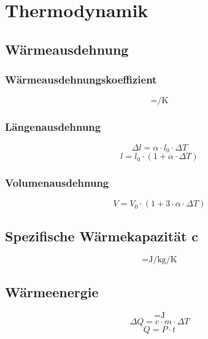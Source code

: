 \documentclass[a4paper]{IEEEtran}
\begin{document}
  \section{Thermodynamik}
  \subsection{Wärmeausdehnung}
  \subsubsection{Wärmeausdehnungskoeffizient}
  \begin{equation}
    [\alpha] = \si{\per\kelvin}
  \end{equation}
  \subsubsection{Längenausdehnung}
  \begin{equation}
    \Delta l = \alpha \cdot l_0 \cdot \Delta T
  \end{equation}
  \begin{equation}
    l = l_0 \cdot (1 + \alpha \cdot \Delta T)
  \end{equation}
  \subsubsection{Volumenausdehnung}
  \begin{equation}
    V = V_0 \cdot (1 + 3 \cdot \alpha \cdot \Delta T)
  \end{equation}

  \subsection{Spezifische Wärmekapazität c}
  \begin{equation}
    [c] = \si{\joule\per\kilogram\per\kelvin}
  \end{equation}
  \subsection{Wärmeenergie}
  \begin{equation}
    [Q] = \si{\joule}
  \end{equation}
  \begin{equation}
    \Delta Q = c \cdot m \cdot \Delta T
  \end{equation}
  \begin{equation}
    Q = P \cdot t
  \end{equation}
\end{document}
